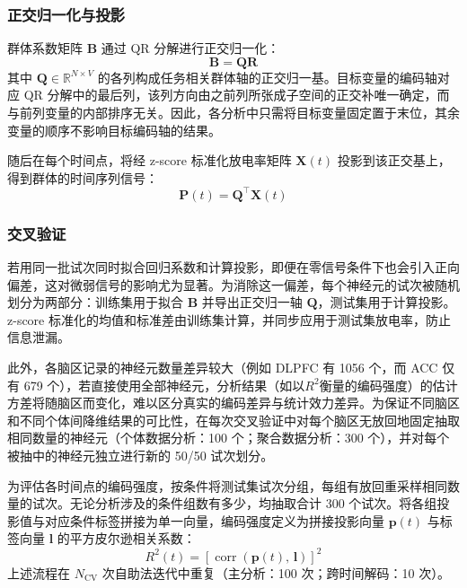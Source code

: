 \subsubsection{正交归一化与投影}

群体系数矩阵 $\mathbf{B}$ 通过 QR 分解进行正交归一化：
\begin{equation}
    \mathbf{B} = \mathbf{Q}\mathbf{R}
\end{equation}
其中 $\mathbf{Q} \in \mathbb{R}^{N \times V}$ 的各列构成任务相关群体轴的正交归一基。目标变量的编码轴对应 QR 分解中的最后列，该列方向由之前列所张成子空间的正交补唯一确定，而与前列变量的内部排序无关。因此，各分析中只需将目标变量固定置于末位，其余变量的顺序不影响目标编码轴的结果。

随后在每个时间点，将经 z-score 标准化放电率矩阵 $\mathbf{X}(t)$ 投影到该正交基上，得到群体的时间序列信号：
\begin{equation}
    \mathbf{P}(t) = \mathbf{Q}^\top \mathbf{X}(t)
\end{equation}

\subsubsection{交叉验证}

若用同一批试次同时拟合回归系数和计算投影，即便在零信号条件下也会引入正向偏差，这对微弱信号的影响尤为显著。为消除这一偏差，每个神经元的试次被随机划分为两部分：训练集用于拟合 $\mathbf{B}$ 并导出正交归一轴 $\mathbf{Q}$，测试集用于计算投影。z-score 标准化的均值和标准差由训练集计算，并同步应用于测试集放电率，防止信息泄漏。

此外，各脑区记录的神经元数量差异较大（例如 DLPFC 有 1056 个，而 ACC 仅有 679 个），若直接使用全部神经元，分析结果（如以$R^2$衡量的编码强度）的估计方差将随脑区而变化，难以区分真实的编码差异与统计效力差异。为保证不同脑区和不同个体间降维结果的可比性，在每次交叉验证中对每个脑区无放回地固定抽取相同数量的神经元（个体数据分析：100 个；聚合数据分析：300 个），并对每个被抽中的神经元独立进行新的 50/50 试次划分。

为评估各时间点的编码强度，按条件将测试集试次分组，每组有放回重采样相同数量的试次。无论分析涉及的条件组数有多少，均抽取合计 300 个试次。将各组投影值与对应条件标签拼接为单一向量，编码强度定义为拼接投影向量 $\mathbf{p}(t)$ 与标签向量 $\mathbf{l}$ 的平方皮尔逊相关系数：
\begin{equation}
R^2(t) = \left[\operatorname{corr}\!\left(\mathbf{p}(t),\,\mathbf{l}\right)\right]^2
\end{equation}
上述流程在 $N_\mathrm{CV}$ 次自助法迭代中重复（主分析：100 次；跨时间解码：10 次）。

